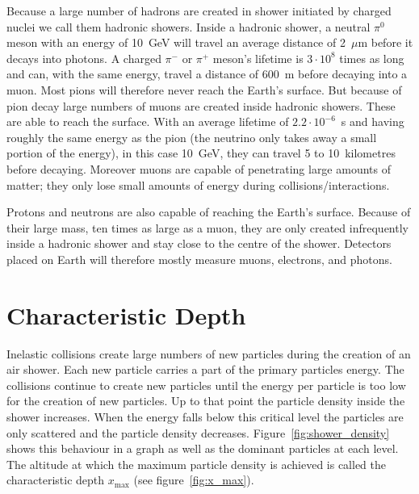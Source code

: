 \documentclass[12pt,a4paper]{article}
\numberwithin{equation}{section}
\numberwithin{figure}{section}
\numberwithin{table}{section}
\begin{document}
Because a large number of hadrons are created in shower initiated by charged nuclei we call them hadronic showers. Inside a hadronic shower, a neutral $\pi^0$ meson with an energy of 10~GeV will travel an average distance of 2~$\mu$m before it decays into photons. A charged $\pi^-$ or $\pi^+$ meson's lifetime is $3 \cdot 10^8$ times as long and can, with the same energy, travel a distance of 600~m before decaying into a muon. Most pions will therefore never reach the Earth's surface. But because of pion decay large numbers of muons are created inside hadronic showers. These are able to reach the surface. With an average lifetime of $2.2 \cdot 10^{-6}$~s and having roughly the same energy as the pion (the neutrino only takes away a small portion of the energy), in this case 10~GeV, they can travel 5 to 10~kilometres before decaying. Moreover muons are capable of penetrating large amounts of matter; they only lose small amounts of energy during collisions/interactions.

Protons and neutrons are also capable of reaching the Earth's surface. Because of their large mass, ten times as large as a muon, they are only created infrequently inside a hadronic shower and stay close to the centre of the shower. Detectors placed on Earth will therefore mostly measure muons, electrons, and photons.

\section{Characteristic Depth}
Inelastic collisions create large numbers of new particles during the creation of an air shower. Each new particle carries a part of the primary particles energy. The collisions continue to create new particles until the energy per particle is too low for the creation of new particles. Up to that point the particle density inside the shower increases. When the energy falls below this critical level the particles are only scattered and the particle density decreases. Figure~\ref{fig:shower_density} shows this behaviour in a graph as well as the dominant particles at each level. The altitude at which the maximum particle density is achieved is called the characteristic depth $x_{\mbox{max}}$ (see figure~\ref{fig:x_max}).
\end{document}
